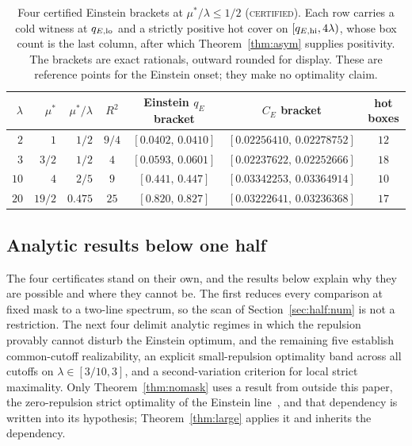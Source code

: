 \documentclass[11pt]{article}
\newcommand{\CE}{C_E}
\newcommand{\muS}{\mu^{*}}
\theoremstyle{definition}
\theoremstyle{remark}
\begin{document}
\begin{table}[t]
\centering
\footnotesize
\setlength{\tabcolsep}{5pt}
\renewcommand{\arraystretch}{1.15}
\begin{tabular}{@{}rrrcccc@{}}
\toprule
$\lambda$ & $\muS$ & $\muS/\lambda$ & $R^2$ & Einstein $q_E$ bracket & $\CE$ bracket &
hot boxes\\
\midrule
$2$ & $1$ & $1/2$ & $9/4$ & $[0.0402,\,0.0410]$ & $[0.02256410,\,0.02278752]$ & $12$\\
$3$ & $3/2$ & $1/2$ & $4$ & $[0.0593,\,0.0601]$ & $[0.02237622,\,0.02252666]$ & $18$\\
$10$ & $4$ & $2/5$ & $9$ & $[0.441,\,0.447]$ & $[0.03342253,\,0.03364914]$ & $10$\\
$20$ & $19/2$ & $0.475$ & $25$ & $[0.820,\,0.827]$ & $[0.03222641,\,0.03236368]$ & $17$\\
\bottomrule
\end{tabular}
\caption{Four certified Einstein brackets at $\muS/\lambda\le1/2$ (\textsc{certified}).
Each row carries a cold witness at $q_{E,\rm lo}$ and a strictly positive hot cover on
$[q_{E,\rm hi},4\lambda)$, whose box count is the last column, after which
Theorem~\ref{thm:asym} supplies positivity. The brackets are exact rationals, outward
rounded for display. These are reference points for the Einstein onset; they make no
optimality claim.}
\label{tab:anchors}
\end{table}

\subsection{Analytic results below one half}\label{sec:half:proof}

The four certificates stand on their own, and the results below explain why they are
possible and where they cannot be. The first reduces every comparison at fixed mask to a
two-line spectrum, so the scan of Section~\ref{sec:half:num} is not a restriction. The
next four delimit analytic regimes in which the repulsion provably cannot disturb the
Einstein optimum, and the remaining five establish common-cutoff realizability, an
explicit small-repulsion optimality band across all cutoffs on $\lambda\in[3/10,3]$, and a
second-variation criterion for local strict maximality. Only Theorem~\ref{thm:nomask} uses
a result from outside this paper, the zero-repulsion strict optimality of the Einstein
line~\cite{rens,kondratev}, and that dependency is written into its hypothesis;
Theorem~\ref{thm:large} applies it and inherits the dependency.
\end{document}
